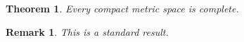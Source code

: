 \documentclass{amsart}
\newtheorem{thm}{Theorem}[section]
\newtheorem*{rem}{Remark}
\begin{document}
\begin{thm}\label{thm:main}
  Every compact metric space is complete.
\end{thm}
\begin{rem}
  This is a standard result.
\end{rem}
\end{document}
